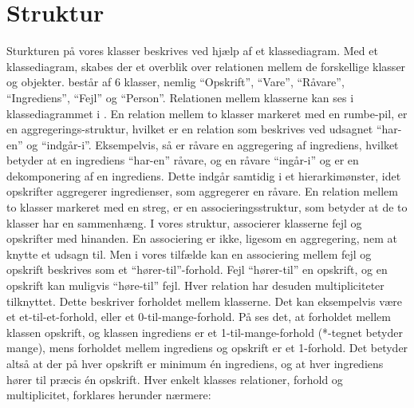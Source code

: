 \section{Struktur}
\label{sec:struktur}

Sturkturen på vores klasser beskrives ved hjælp af et klassediagram. Med et klassediagram, skabes der et overblik over relationen mellem de forskellige klasser og objekter. \Foodl{} består af 6 klasser, nemlig ``Opskrift'', ``Vare'', ``Råvare'', ``Ingrediens'', ``Fejl'' og ``Person''. Relationen mellem klasserne kan ses i klassediagrammet i . En relation mellem to klasser markeret med en rumbe-pil, er en aggregerings-struktur, hvilket er en relation som beskrives ved udsagnet ``har-en'' og ``indgår-i''. Eksempelvis, så er råvare en aggregering af ingrediens, hvilket betyder at en ingrediens ``har-en'' råvare, og en råvare ``ingår-i'' og er en dekomponering af en ingrediens. Dette indgår samtidig i et hierarkimønster, idet opskrifter aggregerer ingredienser, som aggregerer en råvare. En relation mellem to klasser markeret med en streg, er en associeringsstruktur, som betyder at de to klasser har en sammenhæng. I vores struktur, associerer klasserne fejl og opskrifter med hinanden. En associering er ikke, ligesom en aggregering, nem at knytte et udsagn til. Men i vores tilfælde kan en associering mellem fejl og opskrift beskrives som et ``hører-til''-forhold. Fejl ``hører-til'' en opskrift, og en opskrift kan muligvis ``høre-til'' fejl. Hver relation har desuden multipliciteter tilknyttet. Dette beskriver forholdet mellem klasserne. Det kan eksempelvis være et et-til-et-forhold, eller et 0-til-mange-forhold. På  ses det, at forholdet mellem klassen opskrift, og klassen ingrediens er et 1-til-mange-forhold (*-tegnet betyder mange), mens forholdet mellem ingrediens og opskrift er et 1-forhold. Det betyder altså at der på hver opskrift er minimum én ingrediens, og at hver ingrediens hører til præcis én opskrift. Hver enkelt klasses relationer, forhold og multiplicitet, forklares herunder nærmere:



